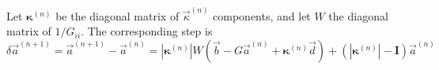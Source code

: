 \documentclass{revtex4}
\newcommand{\abs}[1]{\left|#1\right|}
\begin{document}
Let $\bm{\kappa}^{(n)}$ be the diagonal matrix of $\vec{\kappa}^{(n)}$ components,
and let $W$ the diagonal matrix of $1/G_{ii}$.
The corresponding step is
\begin{equation}
	\delta \vec{a}^{(n+1)} = \vec{a}^{(n+1)} - \vec{a}^{(n)} = \abs{\bm{\kappa}^{(n)}} W \left(\vec{b} -  G \vec{a}^{(n)} +  \bm{\kappa}^{(n)} \vec{d} \right)
	+ \left(\abs{\bm{\kappa}^{(n)}} - \bm{I}\right) \vec{a}^{(n)}
\end{equation}
\end{document}
